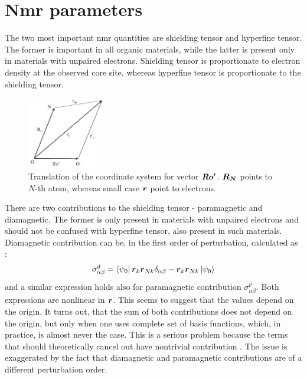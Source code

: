 \documentclass[openany, longbibliography,slovene,a4paper,12pt]{article}
\def\vec#1{\mbox{\boldmath$#1$}}
\begin{document}
\section{Nmr parameters}
The two most important nmr quantities are shielding tensor and hyperfine tensor.
The former is important in all organic materials, while the latter is present
only in materials with unpaired electrons. Shielding tensor is 
proportionate to electron density at the observed  core site, whereas hyperfine
tensor is proportionate to the shielding tensor.


\begin{figure}
\centering
\includegraphics[width=0.3\textwidth]{origin_dependance_tensor.png}
\caption{Translation of the coordinate system for vector $\vec{Ro'}$. $\vec{R_N}$
  points to $N$-th atom, whereas small case $\vec r$ point to electrons.}
\end{figure}

  There are two contributions to the shielding tensor - paramagnetic and
  diamagnetic. The former is only present in materials with unpaired electrons
  and should not be confused with hyperfine tensor, also present in such materials.
  Diamagnetic contribution can be, in the first order of perturbation, calculated as \cite{chemic_shift_tensor_review}:
  \begin{equation}
    \sigma^d_{\alpha \beta}=\bra{\psi_0}\vec{r}_k \vec{r}_{Nk}\delta_{\alpha\beta}- \vec{r}_{k}\vec{r}_{Nk} \ket{\psi_0}
  \end{equation}
  and a similar expression holds also for paramagnetic contribution $\sigma^p_{\alpha\beta}$. Both
  expressions are nonlinear in $\vec r$. This seems to suggest that the values
  depend on the origin. It turns out, that the sum of both contributions does
  not depend on the origin, but only when one uses complete set of basis functions,
  which, in practice, is almost never the case. This is a serious problem
  because the terms that should theoretically cancel out have nontrivial
  contribution \cite{chemic_shift_tensor_review}. The issue is exaggerated by
  the fact that diamagnetic and paramagnetic contributions are of a different
  perturbation order.
\end{document}
